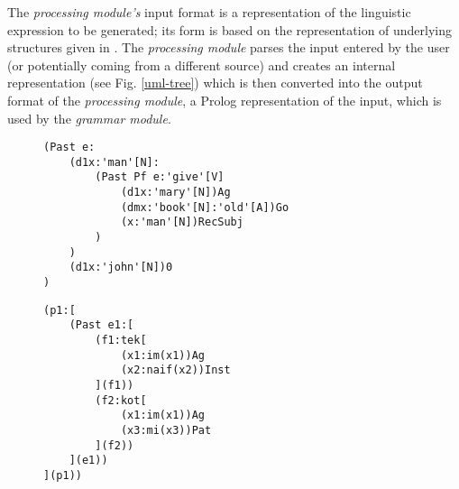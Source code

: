 \documentclass[a4paper, halfparskip, onecolumn, abstracton, final, figurecaptionabove]{scrartcl}
\begin{document}
The \emph{processing module's} input format is a representation of the linguistic expression to be generated; its form is based on the representation of underlying structures given in \cite{Dik1997a}. The \emph{processing module} parses the input entered by the user (or potentially coming from a different source) and creates an internal representation (see Fig. \ref{uml-tree}) which is then converted into the output format of the \emph{processing module}, a Prolog representation of the input, which is used by the \emph{grammar module}.

\begin{figure}
    \begin{center}

\begin{verbatim}
(Past e:
    (d1x:'man'[N]:
        (Past Pf e:'give'[V]
            (d1x:'mary'[N])Ag  
            (dmx:'book'[N]:'old'[A])Go
            (x:'man'[N])RecSubj
        )
    )
    (d1x:'john'[N])0
)
\end{verbatim}


\label{antlr-input}

    \end{center}
    \end{figure}
    
    \begin{figure}
     \begin{center}
  
\begin{verbatim}
(p1:[ 
    (Past e1:[
        (f1:tek[
            (x1:im(x1))Ag
            (x2:naif(x2))Inst
        ](f1))
        (f2:kot[
            (x1:im(x1))Ag
            (x3:mi(x3))Pat
        ](f2))
    ](e1))
](p1))

\end{verbatim}


\label{fdg-rl}  
\end{center}
\end{figure}
\end{document}
